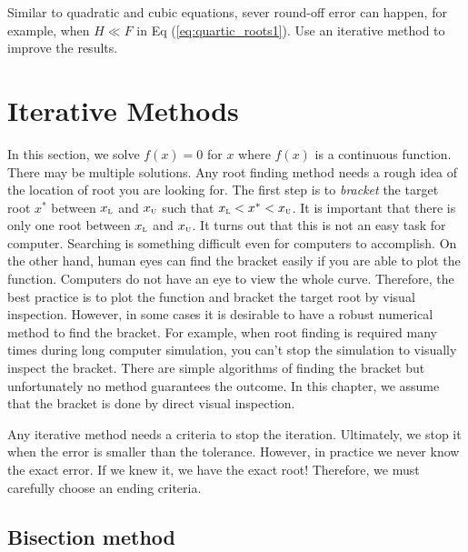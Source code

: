 Similar to quadratic and cubic equations, sever round-off error can happen, for example, when $H \ll F$ in Eq (\ref{eq:quartic_roots1}). Use an iterative method to improve the results.

\section{Iterative Methods}\label{sec:iterative-root-finding}

In this section, we solve $f(x)=0$ for $x$ where $f(x)$ is a continuous function.  There may be multiple solutions.  Any root finding method needs a rough idea of the location of root you are looking for.  The first step is to \emph{bracket} the target root $x^*$ between $x_\textsc{l}$ and $x_\textsc{u}$ such that $x_\textsc{l} < x^* < x_\textsc{u}$.  It is important that there is only one root between $x_\textsc{l}$ and $x_\textsc{u}$.  It turns out that this is not an easy task for computer. Searching is something difficult even for computers to accomplish. On the other hand, human eyes can find the bracket easily if you are able to plot the function.  Computers do not have an eye to view the whole curve.  Therefore, the best practice is to plot the function and bracket the target root by visual inspection.  However, in some cases it is desirable to have a robust numerical method to find the bracket. For example,  when root finding is required many times during long computer simulation, you can't stop the simulation to visually inspect the bracket.   There are simple algorithms of finding the bracket\cite{numerical_recipes} but unfortunately no method guarantees the outcome.   In this chapter, we assume that the bracket is done by direct visual inspection.

Any iterative method needs a criteria to stop the iteration. Ultimately, we stop it when the error is smaller than the tolerance.  However, in practice we never know the exact error.  If we knew it, we have the exact root! Therefore, we must carefully choose an ending criteria.

\subsection{Bisection method}

